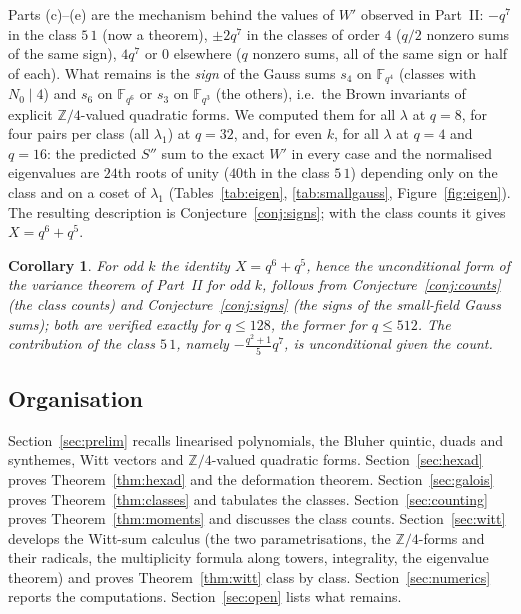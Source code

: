 \documentclass[12pt,a4paper]{amsart}
\newtheorem{corollary}[theorem]{Corollary}
\theoremstyle{definition}
\newcommand{\F}{\mathbb{F}}
\newcommand{\Z}{\mathbb{Z}}
\newcommand{\Spp}{S''}
\begin{document}
Parts (c)--(e) are the mechanism behind the values of $W'$ observed in Part~II: $-q^7$ in the class $5\,1$ (now a theorem), $\pm2q^7$ in the classes of order $4$ ($q/2$ nonzero sums of the same sign), $4q^7$ or $0$ elsewhere ($q$ nonzero sums, all of the same sign or half of each). What remains is the \emph{sign} of the Gauss sums $s_4$ on $\F_{q^4}$ (classes with $N_0\mid4$) and $s_6$ on $\F_{q^6}$ or $s_3$ on $\F_{q^3}$ (the others), i.e.\ the Brown invariants of explicit $\Z/4$-valued quadratic forms. We computed them for all $\lambda$ at $q=8$, for four pairs per class (all $\lambda_1$) at $q=32$, and, for even $k$, for all $\lambda$ at $q=4$ and $q=16$: the predicted $\Spp$ sum to the exact $W'$ in every case and the normalised eigenvalues are $24$th roots of unity ($40$th in the class $5\,1$) depending only on the class and on a coset of $\lambda_1$ (Tables~\ref{tab:eigen}, \ref{tab:smallgauss}, Figure~\ref{fig:eigen}). The resulting description is Conjecture~\ref{conj:signs}; with the class counts it gives $X=q^6+q^5$.

\begin{corollary}\label{cor:X}
For odd $k$ the identity $X=q^6+q^5$, hence the unconditional form of the variance theorem of Part~II for odd $k$, follows from Conjecture~\ref{conj:counts} (the class counts) and Conjecture~\ref{conj:signs} (the signs of the small-field Gauss sums); both are verified exactly for $q\le128$, the former for $q\le512$. The contribution of the class $5\,1$, namely $-\frac{q^2+1}{5}q^7$, is unconditional given the count.
\end{corollary}

\subsection{Organisation}
Section~\ref{sec:prelim} recalls linearised polynomials, the Bluher quintic, duads and synthemes, Witt vectors and $\Z/4$-valued quadratic forms. Section~\ref{sec:hexad} proves Theorem~\ref{thm:hexad} and the deformation theorem. Section~\ref{sec:galois} proves Theorem~\ref{thm:classes} and tabulates the classes. Section~\ref{sec:counting} proves Theorem~\ref{thm:moments} and discusses the class counts. Section~\ref{sec:witt} develops the Witt-sum calculus (the two parametrisations, the $\Z/4$-forms and their radicals, the multiplicity formula along towers, integrality, the eigenvalue theorem) and proves Theorem~\ref{thm:witt} class by class. Section~\ref{sec:numerics} reports the computations. Section~\ref{sec:open} lists what remains.
\end{document}
